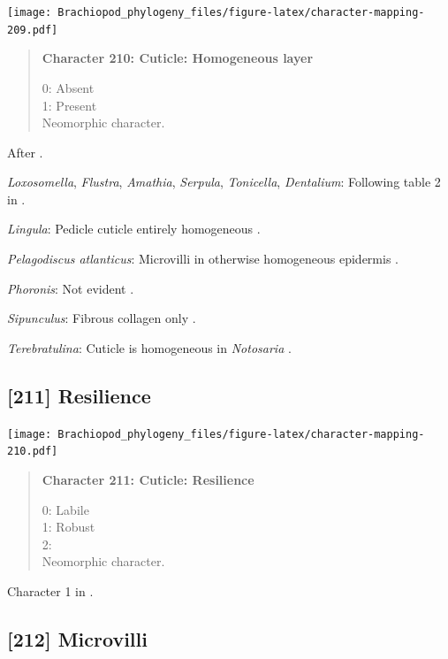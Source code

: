 \documentclass[openany]{book}
\begin{document}
\texttt{[image: Brachiopod\_phylogeny\_files/figure-latex/character-mapping-209.pdf]}

\begin{quote}
\textbf{Character 210: Cuticle: Homogeneous layer}

0: Absent\\
1: Present\\
Neomorphic character.
\end{quote}

After \citet{Borisanova2015}.

\hypertarget{Amathia-coding-210}{}
\emph{Loxosomella}, \emph{Flustra}, \emph{Amathia}, \emph{Serpula},
\emph{Tonicella}, \emph{Dentalium}: Following table 2 in
\citet{Borisanova2015}.

\hypertarget{Lingula-coding-210}{}
\emph{Lingula}: Pedicle cuticle entirely homogeneous
\citep{Williams1997Introduction}.

\hypertarget{Pelagodiscus_atlanticus-coding-210}{}
\emph{Pelagodiscus atlanticus}: Microvilli in otherwise homogeneous
epidermis \citep{Williams1997Introduction}.

\hypertarget{Phoronis-coding-210}{}
\emph{Phoronis}: Not evident \citep{BereiterHahn1984}.

\hypertarget{Sipunculus-coding-210}{}
\emph{Sipunculus}: Fibrous collagen only \citep{BereiterHahn1984}.

\hypertarget{Terebratulina-coding-210}{}
\emph{Terebratulina}: Cuticle is homogeneous in \emph{Notosaria}
\citep{BereiterHahn1984, Williams1997Introduction}.

\subsection*{{[}211{]} Resilience}\label{resilience}

\texttt{[image: Brachiopod\_phylogeny\_files/figure-latex/character-mapping-210.pdf]}

\begin{quote}
\textbf{Character 211: Cuticle: Resilience}

0: Labile\\
1: Robust\\
2:\\
Neomorphic character.
\end{quote}

Character 1 in \citet{Haszprunar2000}.

\subsection*{{[}212{]} Microvilli}\label{microvilli}
\end{document}
